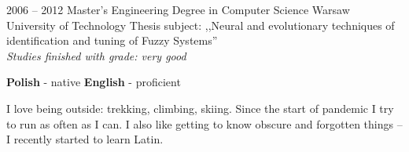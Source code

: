 \documentclass[8pt]{developercv} %
\begin{document}


\begin{entrylist}
	\entry
		{2006 -- 2012}
		{Master's Engineering Degree in Computer Science}
		{Warsaw University of Technology}
		{Thesis subject: ,,Neural and evolutionary techniques of identification and tuning of Fuzzy Systems'' \\ \textit{Studies finished with grade: very good}}
\end{entrylist}


\begin{minipage}[t]{0.5\textwidth}
	\vspace{-\baselineskip} %

	
	\textbf{Polish} - native \hspace{0.2cm} \textbf{English} - proficient
\end{minipage}
\hfill
\begin{minipage}[t]{0.5\textwidth}
	\vspace{-\baselineskip} %
	
	
	I love being outside: trekking, climbing, skiing. Since the start of pandemic I try to run as often as I can. I also like getting to know obscure and forgotten things -- I recently started to learn Latin.
\end{minipage}
\end{document}

